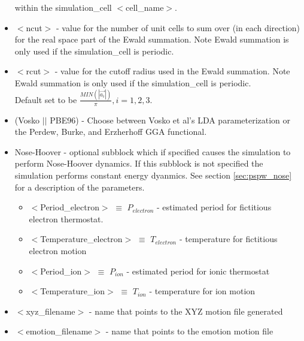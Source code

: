 \begin{itemize}
                           within the simulation\_cell $<$cell\_name$>$.
        \item $<$ncut$>$ - value for the number of unit cells
                          to sum over (in each direction) for the real space
                          part of the Ewald summation. Note Ewald summation
                          is only used if the simulation\_cell is periodic.
        \item $<$rcut$>$ - value for the cutoff radius used
                          in the Ewald summation.  Note Ewald summation
                          is only used if the simulation\_cell is periodic. \\
                          Default set to be
                          $\frac{MIN(\left| \vec{a_i} \right|)}{\pi}, i=1,2,3$.
        \item (Vosko $||$ PBE96) - Choose between Vosko et al's LDA 
                               parameterization or the Perdew, Burke, 
                               and Erzherhoff GGA functional.
        \item Nose-Hoover - optional subblock which if specified
                         causes the simulation to perform Nose-Hoover dynamics.
                         If this subblock is not specified the 
                         simulation performs constant energy dyanmics.
                         See section \ref{sec:pspw_nose} for a description of the parameters.
                         \begin{itemize}
                             \item $<$Period\_electron$>$ $\equiv$ $P_{electron}$ 
                                    - estimated period for fictitious electron thermostat.
                             \item $<$Temperature\_electron$>$ $\equiv$ $T_{electron}$ 
                                    - temperature for fictitious electron motion
                             \item $<$Period\_ion$>$ $\equiv$ $P_{ion}$ 
                                    - estimated period for ionic thermostat
                             \item $<$Temperature\_ion$>$ $\equiv$ $T_{ion}$ 
                                    - temperature for ion motion
                         \end{itemize}
        \item $<$xyz\_filename$>$ - name that points to the XYZ motion file
                                generated
        \item $<$emotion\_filename$>$ - name that points to the emotion motion file

\end{itemize}
